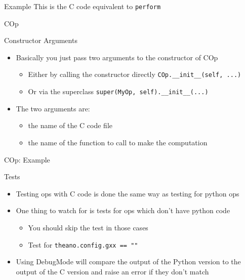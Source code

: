 \documentclass[utf8x]{beamer}
\newcommand{\code}[1]{\lstinline[emph={[2]}]|#1|}
\begin{document}
\begin{frame}[allowframebreaks]{Example}
\vskip5mm
This is the C code equivalent to \code{perform}
\vskip4mm

\end{frame}

\begin{frame}{COp}

\end{frame}

\begin{frame}{Constructor Arguments}
\begin{itemize}
\item Basically you just pass two arguments to the constructor of COp
\begin{itemize}
\item Either by calling the constructor directly \code{COp.__init__(self, ...)}
\item Or via the superclass \code{super(MyOp, self).__init__(...)}
\end{itemize}
\item The two arguments are:
\begin{itemize}
\item the name of the C code file
\item the name of the function to call to make the computation
\end{itemize}
\end{itemize}
\end{frame}

\begin{frame}{COp: Example}
\only<1>{}
\end{frame}

\begin{frame}{Tests}
\begin{itemize}
\item Testing ops with C code is done the same way as testing for python ops
\item One thing to watch for is tests for ops which don't have python code
\begin{itemize}
\item You should skip the test in those cases
\item Test for \code{theano.config.gxx == ""}
\end{itemize}
\item Using DebugMode will compare the output of the Python version to the output of the C version and raise an error if they don't match
\end{itemize}
\end{frame}
\end{document}
